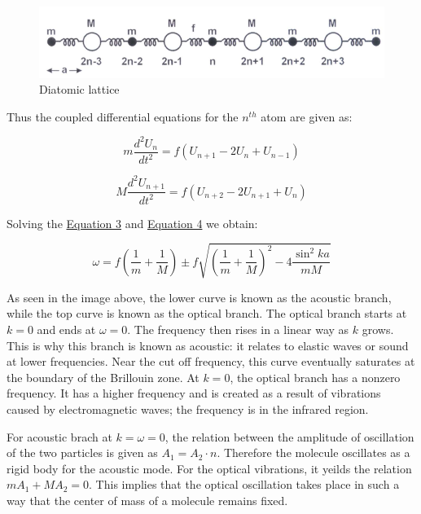 		\begin{figure}[h]
			\centering
			\includegraphics[width=0.9\columnwidth]{images/theory3.png}
			\caption{Diatomic lattice}
			\label{fig:theory3}
		\end{figure}

		Thus the coupled differential equations for the $n^{th}$ atom are given as:

		\begin{equation}
			m \frac{d^2U_n}{dt^2} = f(U_{n+1} - 2U_n + U_{n-1})
			\label{eqn:3}
		\end{equation}

		\begin{equation}
			M \frac{d^2U_{n+1}}{dt^2} = f(U_{n+2} - 2U_{n+1} + U_{n})
			\label{eqn:4}
		\end{equation}

		Solving the \hyperref[eqn:3]{Equation 3} and \hyperref[eqn:4]{Equation 4} we obtain:

		$$\omega = f\left(\frac{1}{m}+\frac{1}{M}\right)\pm f\sqrt{\left(\frac{1}{m}+\frac{1}{M}\right)^2 - 4 \frac{\sin^2ka}{mM}} $$

		As seen in the image above, the lower curve is known as the acoustic branch, while the top curve is known as the optical branch. The optical branch starts at $k = 0$ and ends at $\omega = 0$. The frequency then rises in a linear way as $k$ grows. This is why this branch is known as acoustic: it relates to elastic waves or sound at lower frequencies. Near the cut off frequency, this curve eventually saturates at the boundary of the Brillouin zone. At $k = 0$, the optical branch has a nonzero frequency. It has a higher frequency and is created as a result of vibrations caused by electromagnetic waves; the frequency is in the infrared region.

		For acoustic brach at $k = \omega = 0$, the relation between the amplitude of oscillation of the two particles is given as $A_1 = A_2 \cdot n$. Therefore the molecule oscillates as a rigid body for the acoustic mode. For the optical vibrations, it yeilds the relation $mA_1 + MA_2 = 0$. This implies that the optical oscillation takes place in such a way that the center of mass of a molecule remains fixed.

